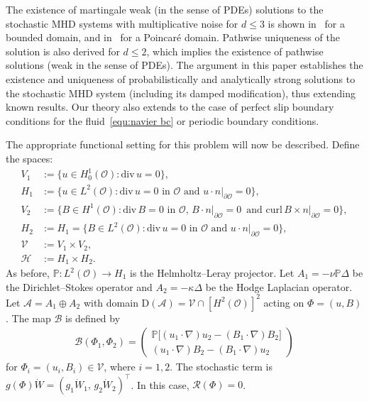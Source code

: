 \documentclass[11pt, reqno]{amsart}
\theoremstyle{definition}
\numberwithin{equation}{section}
\newcommand{\bb}{\mathbb}
\newcommand{\divg}{\mathrm{div}\,}
\begin{document}
The existence of martingale weak (in the sense of PDEs) solutions to the stochastic MHD systems with multiplicative noise for $d\leq 3$ is shown in~\cite{SriSun99, Yam16} for a bounded domain, and in~\cite{Mot22} for a Poincar\'e domain. Pathwise uniqueness of the solution is also derived for $d\leq 2$, which implies the existence of pathwise solutions (weak in the sense of PDEs). The argument in this paper establishes the existence and uniqueness of probabilistically and analytically strong solutions to the stochastic MHD system (including its damped modification), thus extending known results. Our theory also extends to the case of perfect slip boundary conditions for the fluid~\eqref{equ:navier bc} or periodic boundary conditions.

The appropriate functional setting for this problem will now be described. Define the spaces:
\begin{align*}
    V_1 &:= \{u\in H^1_0(\mathscr{O}): \divg u=0\},
    \\
    H_1 &:= \{u\in L^2(\mathscr{O}): \divg u=0 \text{ in $\mathscr{O}$ and } \left. u\cdot n \right|_{\partial \mathscr{O}}= 0\},
    \\
    V_2 &:= \{B\in H^1(\mathscr{O}): \divg B=0 \text{ in $\mathscr{O}$, } \left. B\cdot n \right|_{\partial \mathscr{O}}= 0 \,\text{ and } \left.\mathrm{curl}\, B\times n\right|_{\partial\mathscr{O}}=0 \},
    \\
    H_2 &:= H_1= \{B\in L^2(\mathscr{O}): \divg u=0 \text{ in $\mathscr{O}$ and } \left. u\cdot n \right|_{\partial \mathscr{O}}= 0\},
    \\
    \mathcal{V} &:= V_1 \times V_2,
    \\
    \mathcal{H} &:= H_1 \times H_2.
\end{align*}
As before, $\bb{P}:L^2(\mathscr{O})\to H_1$ is the Helmholtz--Leray projector. Let $A_1= -\nu \bb{P}\Delta$ be the Dirichlet--Stokes operator and $A_2= -\kappa \Delta$ be the Hodge Laplacian operator. Let $\mathcal{A}=A_1\oplus A_2$ with domain $\mathrm{D}(\mathcal{A})= \mathcal{V} \cap \left[H^2(\mathscr{O})\right]^2$ acting on $\Phi=(u,B)$. The map $\mathcal{B}$ is defined by
\begin{align*}
    \mathcal{B}(\Phi_1,\Phi_2)= 
    \begin{pmatrix} \bb{P}\big[(u_1\cdot\nabla)u_2- (B_1\cdot\nabla)B_2\big] \\[0.5ex] (u_1\cdot\nabla)B_2-(B_1\cdot\nabla)u_2 \end{pmatrix}
\end{align*}
for $\Phi_i=(u_i,B_i)\in \mathcal{V}$, where $i=1,2$. The stochastic term is $g(\Phi)\dot{W}= (g_1\dot{W}_1,\, g_2\dot{W}_2)^\top$. In this case, $\mathcal{R}(\Phi)=0$.
\end{document}
